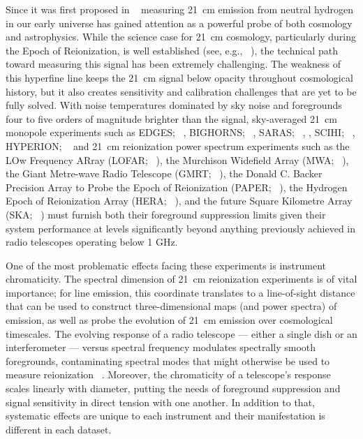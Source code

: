 \documentclass[twocolumn]{emulateapj}
\begin{document}
    Since it was first proposed in ~\citep{Shaver_et_al1999} measuring 21~cm
    emission from neutral hydrogen in our early universe has gained attention as a
    powerful probe of both cosmology and astrophysics.  While the science case for
    21~cm cosmology, particularly during the Epoch of Reionization, is well
    established (see, e.g.,
    ~\cite{furlanetto_et_al2006, morales_wyithe2010, pritchard_loeb2012}),
    the technical path toward measuring this signal has been extremely challenging.  The
    weakness of this hyperfine line keeps the 21~cm signal below opacity throughout
    cosmological history, but it also creates sensitivity and calibration
    challenges that are yet to be fully solved.  With noise temperatures dominated
    by sky noise and foregrounds four to five orders of magnitude
    brighter than the signal, 
    sky-averaged 21~cm monopole experiments such as
    EDGES; ~\citep{Bowman_et_al2010},
    BIGHORNS; ~\citealt{2015PhDT........65V},
    SARAS; ~\citep{Patra_et_al2015}, \citep{Patra_et_al2013} ,
    SCIHI; ~\citep{2015PhDT........65V},
    HYPERION; ~\citep{presley_et_al2015}
    and 21~cm reionization power spectrum experiments such as
    the LOw Frequency ARray (LOFAR; ~\citealt{van_Haarlem_2013}),
    the Murchison Widefield Array (MWA; ~\citealt{Tingay_2013}),
    the Giant Metre-wave Radio Telescope (GMRT; ~\citealt{Paciga_et_al2011}),
    the Donald C. Backer Precision Array to Probe the Epoch of Reionization (PAPER; ~\citealt{parsons_et_al2010}),
    the Hydrogen Epoch of Reionization Array (HERA; ~\citealt{deBoer_2016}),
    and the future Square Kilometre Array (SKA; ~\citealt{XXX})
    must furnish both their foreground suppression limits given their system performance at levels significantly
    beyond anything previously achieved in radio telescopes operating below 1 GHz.
    
    One of the most problematic effects facing these experiments is instrument
    chromaticity.  The spectral dimension of 21~cm reionization experiments is of vital
    importance; for line emission, this coordinate translates to a line-of-sight distance
    that can be used to construct three-dimensional maps (and power spectra) of emission,
    as well as probe the evolution of 21~cm emission over cosmological timescales.
    The evolving response of a radio telescope --- either a single dish
    or an interferometer --- versus spectral frequency modulates spectrally smooth foregrounds,
    contaminating spectral modes that might
    otherwise be used to measure reionization ~\citep{liu_et_al2014a}.  Moreover, the chromaticity of
    a telescope's response scales linearly with diameter, putting the
    needs of foreground suppression and signal sensitivity in direct tension with one
    another. In addition to that, systematic effects are unique to each instrument and their manifestation 
    is different in each dataset.
    
\end{document}
